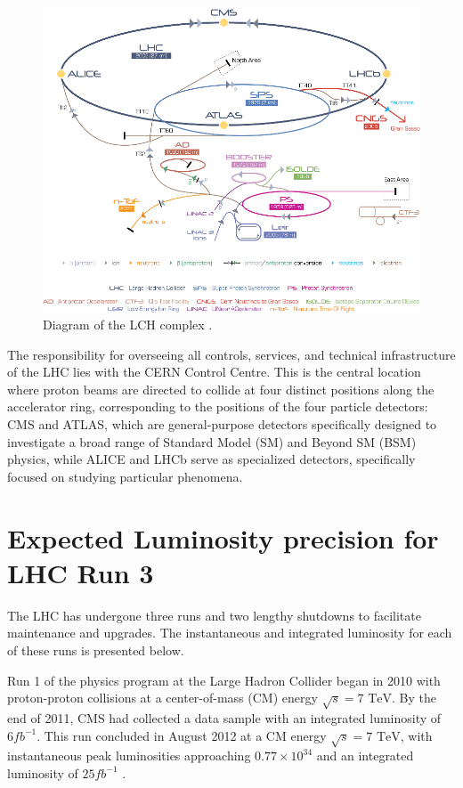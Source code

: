 \begin{center}
  \begin{figure}[h]
    \centering
    \includegraphics[scale=.33]{Chapter1/lhc_complex_fig.png}
    \caption[LHC Complex]{Diagram of the LCH complex \cite{lhc_complex}.}
    \label{lhc_com}
  \end{figure}
\end{center}

The responsibility for overseeing all controls, services, and technical infrastructure of the LHC lies with the CERN Control Centre. This is the central location where proton beams are directed to collide at four distinct positions along the accelerator ring, corresponding to the positions of the four particle detectors: CMS and ATLAS, which are general-purpose detectors specifically designed to investigate a broad range of Standard Model (SM) and Beyond SM (BSM) physics, while ALICE and LHCb serve as specialized detectors, specifically focused on studying particular phenomena.

\section{Expected  Luminosity precision for LHC Run 3}

The LHC has undergone three runs and two lengthy shutdowns to facilitate maintenance and upgrades. The instantaneous and integrated luminosity for each of these runs is presented below.

Run 1 of the physics program at the Large Hadron Collider began in 2010 with proton-proton collisions at a center-of-mass (CM) energy  $\sqrt{s}=\text{7 TeV}$. By the end of 2011, CMS had collected a data sample with an integrated luminosity of $6 fb^{-1}$. This run concluded in August 2012 at a CM energy $\sqrt{s}=\text{7 TeV}$, with instantaneous peak luminosities approaching $0.77 \times 10^{34}$ and an integrated luminosity of $25 fb^{-1}$ \cite{LHC_status_2013}.

